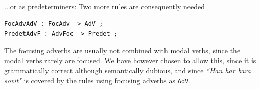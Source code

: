 \documentclass{report}
\begin{document}
...or as predeterminers:
Two more rules are consequently needed
\begin{verbatim}
FocAdvAdV : FocAdv -> AdV ;
PredetAdvF : AdvFoc -> Predet ;
\end{verbatim}



The focusing adverbs are usually not combined with modal verbs, since the modal
verbs rarely are focused.
We have however chosen to allow this, since it is grammatically correct although semantically
dubious, and since \emph{``Han har bara sovit"} is covered by the rules using focusing
adverbs as \verb-AdV-.


%
\end{document}
